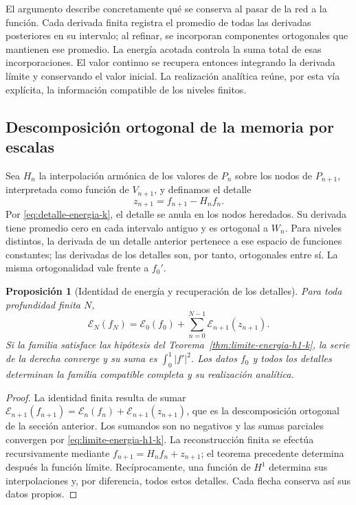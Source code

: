 \documentclass[a4paper,10pt]{article}
\newtheorem{proposition}[theorem]{Proposición}
\theoremstyle{definition}\newtheorem{definition}[theorem]{Definición}
\theoremstyle{remark}\newtheorem{remark}[theorem]{Observación}
\numberwithin{equation}{section}
\begin{document}
El argumento describe concretamente qué se conserva al pasar de la red
a la función. Cada derivada finita registra el promedio de todas las
derivadas posteriores en su intervalo; al refinar, se incorporan
componentes ortogonales que mantienen ese promedio. La energía acotada
controla la suma total de esas incorporaciones. El valor continuo se
recupera entonces integrando la derivada límite y conservando el valor
inicial. La realización analítica reúne, por esta vía explícita, la
información compatible de los niveles finitos.

\subsection{Descomposición ortogonal de la memoria por escalas}

Sea \(H_n\) la interpolación armónica de los valores de \(P_n\)
sobre los nodos de \(P_{n+1}\), interpretada como función de
\(V_{n+1}\), y definamos el detalle
\[
 z_{n+1}=f_{n+1}-H_nf_n.
\]
Por \eqref{eq:detalle-energia-k}, el detalle se anula en los nodos
heredados. Su derivada tiene promedio cero en cada intervalo antiguo
y es ortogonal a \(W_n\). Para niveles distintos, la derivada de
un detalle anterior pertenece a ese espacio de funciones constantes;
las derivadas de los detalles son, por tanto, ortogonales entre sí.
La misma ortogonalidad vale frente a \(f_0'\).

\begin{proposition}[Identidad de energía y recuperación de los detalles]
\label{prop:memoria-energetica-escalas-k}
Para toda profundidad finita \(N\),
\begin{equation}
 \mathcal E_N(f_N)
 =\mathcal E_0(f_0)
 +\sum_{n=0}^{N-1}\mathcal E_{n+1}(z_{n+1}).
 \label{eq:energia-telescopica-detalles-k}
\end{equation}
Si la familia satisface las hipótesis del
Teorema~\ref{thm:limite-energia-h1-k}, la serie de la derecha
converge y su suma es \(\int_0^1|f'|^2\). Los datos \(f_0\)
y todos los detalles determinan la familia compatible completa y su
realización analítica.
\end{proposition}
\begin{proof}
La identidad finita resulta de sumar
\(\mathcal E_{n+1}(f_{n+1})
=\mathcal E_n(f_n)+\mathcal E_{n+1}(z_{n+1})\), que es la
descomposición ortogonal de la sección anterior. Los sumandos son
no negativos y las sumas parciales convergen por
\eqref{eq:limite-energia-h1-k}. La reconstrucción finita se efectúa
recursivamente mediante \(f_{n+1}=H_nf_n+z_{n+1}\); el teorema
precedente determina después la función límite. Recíprocamente, una
función de \(H^1\) determina sus interpolaciones y, por diferencia,
todos estos detalles. Cada flecha conserva así sus datos propios.
\end{proof}
\end{document}
